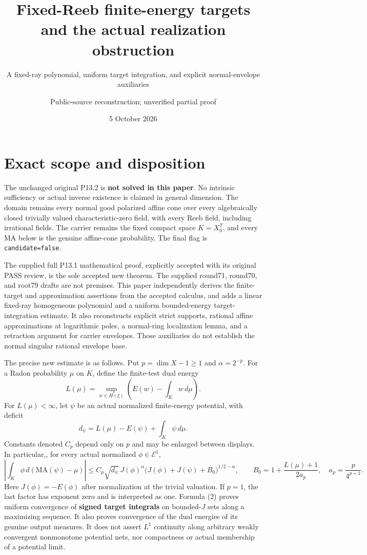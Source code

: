 \documentclass[
  10pt,
]{article}
\title{Fixed-Reeb finite-energy targets and the actual realization
obstruction}
\subtitle{A fixed-ray polynomial, uniform target integration, and
explicit normal-envelope auxiliaries}
\author{Public-source reconstruction; unverified partial proof}
\date{5 October 2026}
\begin{document}
\maketitle

\section{Exact scope and disposition}\label{exact-scope-and-disposition}

The unchanged original P13.2 is \textbf{not solved in this paper}. No
intrinsic sufficiency or actual inverse existence is claimed in general
dimension. The domain remains every normal good polarized affine cone
over every algebraically closed trivially valued characteristic-zero
field, with every Reeb field, including irrational fields. The carrier
remains the fixed compact space \(K=X_0^T\), and every MA below is the
genuine affine-cone probability. The final flag is
\texttt{candidate=false}.

The supplied full P13.1 mathematical proof, explicitly accepted with its
original PASS review, is the sole accepted new theorem. The supplied
round71, round70, and root79 drafts are not premises. This paper
independently derives the finite-target and approximation assertions
from the accepted calculus, and adds a linear fixed-ray homogeneous
polynomial and a uniform bounded-energy target-integration estimate. It
also reconstructs explicit strict supports, rational affine
approximations at logarithmic poles, a normal-ring localization lemma,
and a retraction argument for carrier envelopes. Those auxiliaries do
not establish the normal singular rational envelope base.

The precise new estimate is as follows. Put \(p=\dim X-1\ge1\) and
\(\alpha=2^{-p}\). For a Radon probability \(\mu\) on \(K\), define the
finite-test dual energy \[
 L(\mu)=\sup_{w\in H(\xi)}\left(E(w)-\int_Kw\,d\mu\right).
 \tag{1}
\] For \(L(\mu)<\infty\), let \(\psi\) be an actual normalized
finite-energy potential, with deficit
\[d_\psi=L(\mu)-E(\psi)+\int_K\psi\,d\mu.\] Constants denoted \(C_p\)
depend only on \(p\) and may be enlarged between displays. In
particular,, for every actual normalized \(\phi\in\mathcal E^1\), \[
 \left|\int_K\phi\,d(\mathrm{MA}(\psi)-\mu)\right|
 \le C_p\sqrt{d_\psi}\,J(\phi)^\alpha
       \big(J(\phi)+J(\psi)+B_0\big)^{1/2-\alpha},
 \qquad B_0=1+\frac{L(\mu)+1}{2a_p},\quad a_p=\frac p{4^{p+1}}.
 \tag{2}
\] Here \(J(\phi)=-E(\phi)\) after normalization at the trivial
valuation. If \(p=1\), the last factor has exponent zero and is
interpreted as one. Formula (2) proves uniform convergence of
\textbf{signed target integrals} on bounded-\(J\) sets along a
maximizing sequence. It also proves convergence of the dual energies of
its genuine output measures. It does not assert \(L^1\) continuity along
arbitrary weakly convergent nonmonotone potential nets, nor compactness
or actual membership of a potential limit.
\end{document}
